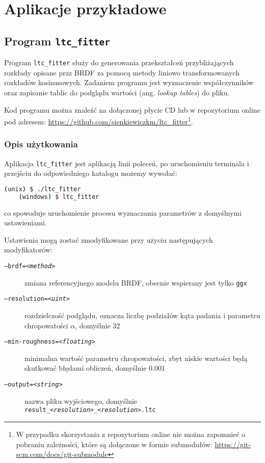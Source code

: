 \documentclass[../main.tex]{subfiles}
\begin{document}
\chapter{Aplikacje przykładowe}

\section{Program \texttt{ltc\_fitter}}

Program \texttt{ltc\_fitter} służy do generowania przekształceń przybliżających rozkłady opisane przz BRDF za pomocą metody liniowo transformowanych rozkładów kosinusowych. Zadaniem programu jest wyznaczenie współczynników oraz zapisanie tablic do podglądu wartości (ang. \textit{lookup tables}) do pliku.

Kod programu można znaleźć na dołączonej płycie CD lub w repozytorium online pod adresem: \url{https://github.com/sienkiewiczkm/ltc_fitter}\footnote{W przypadku skorzystania z repozytorium online nie można zapomnieć o pobraniu zależności, które są dołączone w formie submodułów: \url{https://git-scm.com/docs/git-submodule}}.

\subsection{Opis użytkowania}

Aplikacja \texttt{ltc\_fitter} jest aplikacją linii poleceń, po uruchomieniu terminala i przejściu do odpowiedniego katalogu możemy wywołać:

\begin{lstlisting}[language=bash,numbers=none]
       (unix) $ ./ltc_fitter
    (windows) $ ltc_fitter
\end{lstlisting}

\noindent co spowoduje uruchomienie procesu wyznaczania parametrów z domyślnymi ustawieniami.

Ustawienia mogą zostać zmodyfikowane przy użyciu następujących modyfikatorów:
\begin{description}
    \item[\texttt{--brdf=\textit{<method>}}] zmiana referencyjnego modelu BRDF, obecnie wspierany jest tylko \texttt{ggx}
    
    \item[\texttt{--resolution=\textit{<uint>}}] rozdzielczość podglądu, oznacza liczbę podziałów kąta padania i parametru chropowatości $\alpha$, domyślnie $32$
    
    \item[\texttt{--min-roughness=\textit{<floating>}}] minimalna wartość parametru chropowatości, zbyt niskie wartości będą skutkować błędami obliczeń, domyślnie $0.001$
    
    \item[\texttt{--output=\textit{<string>}}] nazwa pliku wyjściowego, domyślnie \texttt{result\_\textit{<resolution>}\_\textit{<resolution>}.ltc}
\end{description}
\end{document}
